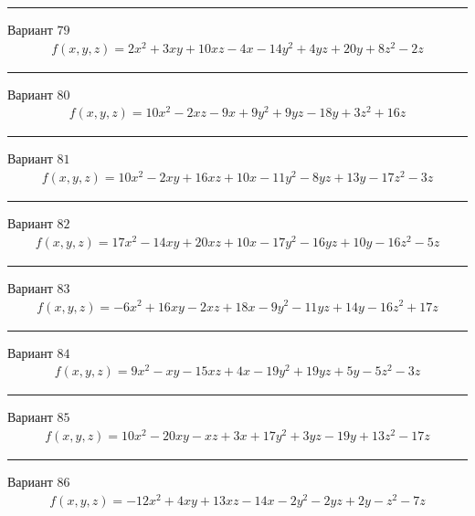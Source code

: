 \documentclass[11pt]{report}
\begin{document}
\begin{center}
\noindent\rule{8cm}{0.4pt}
\end{center}
Вариант $79$
\begin{align*}
    f(x, y, z) = 2 x^{2} + 3 x y + 10 x z - 4 x - 14 y^{2} + 4 y z + 20 y + 8 z^{2} - 2 z
\end{align*}
\begin{center}
\noindent\rule{8cm}{0.4pt}
\end{center}
Вариант $80$
\begin{align*}
    f(x, y, z) = 10 x^{2} - 2 x z - 9 x + 9 y^{2} + 9 y z - 18 y + 3 z^{2} + 16 z
\end{align*}
\begin{center}
\noindent\rule{8cm}{0.4pt}
\end{center}
Вариант $81$
\begin{align*}
    f(x, y, z) = 10 x^{2} - 2 x y + 16 x z + 10 x - 11 y^{2} - 8 y z + 13 y - 17 z^{2} - 3 z
\end{align*}
\begin{center}
\noindent\rule{8cm}{0.4pt}
\end{center}
Вариант $82$
\begin{align*}
    f(x, y, z) = 17 x^{2} - 14 x y + 20 x z + 10 x - 17 y^{2} - 16 y z + 10 y - 16 z^{2} - 5 z
\end{align*}
\begin{center}
\noindent\rule{8cm}{0.4pt}
\end{center}
Вариант $83$
\begin{align*}
    f(x, y, z) = - 6 x^{2} + 16 x y - 2 x z + 18 x - 9 y^{2} - 11 y z + 14 y - 16 z^{2} + 17 z
\end{align*}
\begin{center}
\noindent\rule{8cm}{0.4pt}
\end{center}
Вариант $84$
\begin{align*}
    f(x, y, z) = 9 x^{2} - x y - 15 x z + 4 x - 19 y^{2} + 19 y z + 5 y - 5 z^{2} - 3 z
\end{align*}
\begin{center}
\noindent\rule{8cm}{0.4pt}
\end{center}
Вариант $85$
\begin{align*}
    f(x, y, z) = 10 x^{2} - 20 x y - x z + 3 x + 17 y^{2} + 3 y z - 19 y + 13 z^{2} - 17 z
\end{align*}
\begin{center}
\noindent\rule{8cm}{0.4pt}
\end{center}
Вариант $86$
\begin{align*}
    f(x, y, z) = - 12 x^{2} + 4 x y + 13 x z - 14 x - 2 y^{2} - 2 y z + 2 y - z^{2} - 7 z
\end{align*}
\end{document}
